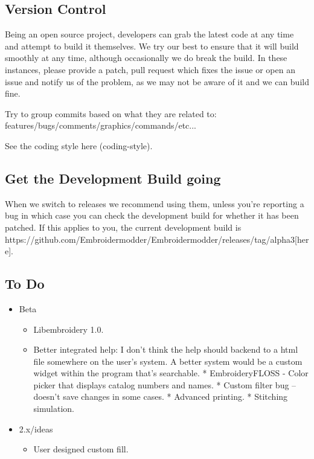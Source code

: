 \documentclass[a4paper]{report}
\begin{document}
\subsection{Version Control}

Being an open source project, developers can grab the latest code at any time
and attempt to build it themselves. We try our best to ensure that it will build smoothly
at any time, although occasionally we do break the build. In these instances,
please provide a patch, pull request which fixes the issue or open an issue and
notify us of the problem, as we may not be aware of it and we can build fine.

Try to group commits based on what they are related to: features/bugs/comments/graphics/commands/etc...

See the coding style  here (coding-style).

\subsection{Get the Development Build going}

When we switch to releases we recommend using them, unless you're reporting a bug in which case you can check the development build for whether it has been patched. If this applies to you, the current development build is https://github.com/Embroidermodder/Embroidermodder/releases/tag/alpha3[here].

\subsection{To Do}

\begin{itemize}
\item Beta
\begin{itemize}
\item Libembroidery 1.0.
\item Better integrated help: I don't think the help should backend to a html file somewhere on the user's system. A better system would be a custom widget within the program that's searchable.
  * EmbroideryFLOSS - Color picker that displays catalog numbers and names.
  * Custom filter bug -- doesn't save changes in some cases.
  * Advanced printing.
  * Stitching simulation.
\end{itemize}
\item 2.x/ideas
\begin{itemize}
\item User designed custom fill.
\end{itemize}
\end{itemize}
\end{document}
